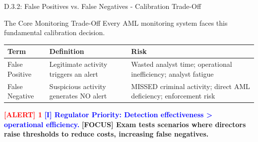 \documentclass[11pt,a4paper]{beamer}
\newcommand{\redflag}[1]{\textcolor{red}{\textbf{[ALERT] 1}}}
\newcommand{\bluenote}[1]{\textcolor{blue}{\textbf{[I] #1}}}
\newcommand{\examfocus}[1]{\textcolor{orange!80!black}{\textbf{[FOCUS] #1}}}
\begin{document}
\begin{frame}{D.3.2: False Positives vs. False Negatives - Calibration Trade-Off}
	\begin{block}{The Core Monitoring Trade-Off}
		Every AML monitoring system faces this fundamental calibration decision.
	\end{block}
	\begin{tabular}{p{}|p{}|p{}}
		\hline
		\rowcolor{lightgray}
		\textbf{Term} & \textbf{Definition} & \textbf{Risk} \\
		\hline
		False Positive & Legitimate activity triggers an alert & Wasted analyst time; operational inefficiency; analyst fatigue \\
		\hline
		False Negative & Suspicious activity generates NO alert & MISSED criminal activity; direct AML deficiency; enforcement risk \\
		\hline
	\end{tabular}
	\vspace{0.2cm}
	\redflag{Which is worse? FALSE NEGATIVES are significantly worse.}
	\bluenote{Regulator Priority: Detection effectiveness > operational efficiency.}
	\examfocus{Exam tests scenarios where directors raise thresholds to reduce costs, increasing false negatives.}
\end{frame}
\end{document}
